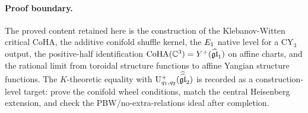 \paragraph{Proof boundary.}
The proved content retained here is the construction of the
Klebanov-Witten critical CoHA, the additive conifold shuffle kernel, the
\(E_1\) native level for a CY\(_3\) output, the positive-half
identification \(\mathrm{CoHA}(\mathbb{C}^3)=Y^+(\widehat{\mathfrak{gl}}_1)\) on affine charts,
and the rational limit from toroidal structure functions to affine
Yangian structure functions.  The \(K\)-theoretic equality with
\(\mathrm{U}^+_{q_1,q_2}(\widehat{\widehat{\mathfrak{gl}}}_2)\) is recorded as a
construction-level target: prove the conifold wheel conditions, match
the central Heisenberg extension, and check the PBW/no-extra-relations
ideal after completion.
